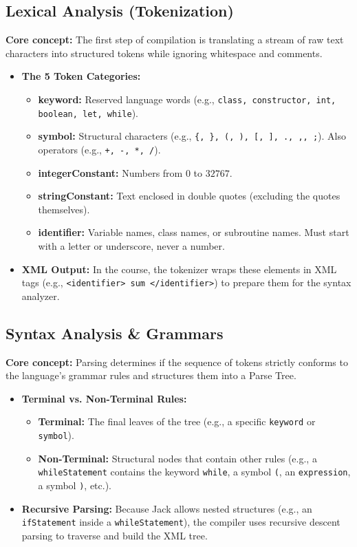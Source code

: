 \documentclass[12pt,a4paper]{article}
\begin{document}
\subsection{Lexical Analysis (Tokenization)}
\textbf{Core concept:} The first step of compilation is translating a stream of raw text characters into structured tokens while ignoring whitespace and comments.
\begin{itemize}
    \item \textbf{The 5 Token Categories:} 
    \begin{itemize}
        \item \textbf{keyword:} Reserved language words (e.g., \texttt{class, constructor, int, boolean, let, while}).
        \item \textbf{symbol:} Structural characters (e.g., \texttt{\{, \}, (, ), [, ], ., ,, ;}). Also operators (e.g., \texttt{+, -, *, /}).
        \item \textbf{integerConstant:} Numbers from $0$ to $32767$.
        \item \textbf{stringConstant:} Text enclosed in double quotes (excluding the quotes themselves).
        \item \textbf{identifier:} Variable names, class names, or subroutine names. Must start with a letter or underscore, never a number.
    \end{itemize}
    \item \textbf{XML Output:} In the course, the tokenizer wraps these elements in XML tags (e.g., \texttt{<identifier> sum </identifier>}) to prepare them for the syntax analyzer.
\end{itemize}

\subsection{Syntax Analysis \& Grammars}
\textbf{Core concept:} Parsing determines if the sequence of tokens strictly conforms to the language's grammar rules and structures them into a Parse Tree.
\begin{itemize}
    \item \textbf{Terminal vs. Non-Terminal Rules:}
    \begin{itemize}
        \item \textbf{Terminal:} The final leaves of the tree (e.g., a specific \texttt{keyword} or \texttt{symbol}).
        \item \textbf{Non-Terminal:} Structural nodes that contain other rules (e.g., a \texttt{whileStatement} contains the keyword \texttt{while}, a symbol \texttt{(}, an \texttt{expression}, a symbol \texttt{)}, etc.).
    \end{itemize}
    \item \textbf{Recursive Parsing:} Because Jack allows nested structures (e.g., an \texttt{ifStatement} inside a \texttt{whileStatement}), the compiler uses recursive descent parsing to traverse and build the XML tree.
\end{itemize}
\end{document}
